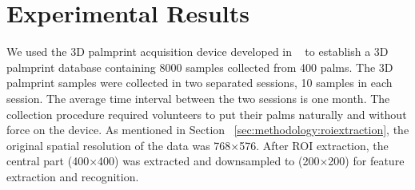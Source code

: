 
\chapter{Experimental Results\label{ch:experiment}}

We used the 3D palmprint acquisition device developed in ~\cite{Zhang:2009dp} to establish a 3D palmprint database containing 8000 samples collected from 400 palms. The 3D palmprint samples were collected in two separated sessions, 10 samples in each session. The average time interval between the two sessions is one month. The collection procedure required volunteers to put their palms naturally and without force on the device. As mentioned in Section ~\ref{sec:methodology:roiextraction}, the original spatial resolution of the data was 768×576. After ROI extraction, the central part (400×400) was extracted and downsampled to (200×200) for feature extraction and recognition.



